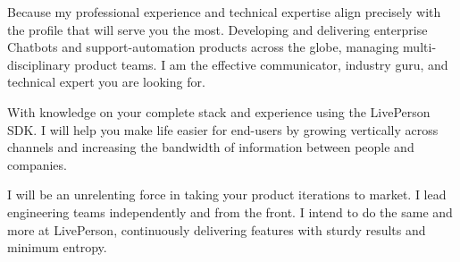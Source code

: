 Because my professional experience and technical expertise align precisely with the profile that will serve you the most. Developing and delivering enterprise Chatbots and support-automation products across the globe, managing multi-disciplinary product teams. I am the effective communicator, industry guru, and technical expert you are looking for.  

With knowledge on your complete stack and experience using the LivePerson SDK. I will help you make life easier for end-users by growing vertically across channels and increasing the bandwidth of information between people and companies.

I will be an unrelenting force in taking your product iterations to market. I lead engineering teams independently and from the front. I intend to do the same and more at LivePerson, continuously delivering features with sturdy results and minimum entropy.

